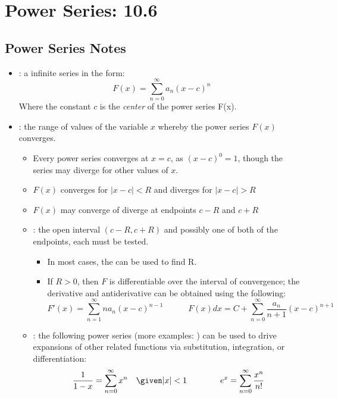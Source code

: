 \chapter{Power Series: 10.6}

\section{Power Series Notes}
\begin{itemize}
  \item {}: a infinite series in the form:
    \[%
    F(x) = \sum_{n=0}^{\infty} a_n (x - c)^n
    \]%
    Where the constant \(c\) is the \textit{center} of the power series F(x).

  \item {}: the range of values of the variable \(x\)
    whereby the power series \(F(x)\) converges.
    \begin{itemize}
      \item Every power series converges at \(x = c\), as \((x-c)^0 = 1\),
        though the series may diverge for other values of \(x\).

      \item \(F(x)\) converges for \(\left| x - c \right| < R \) and diverges
        for \(\left| x - c \right| > R \)

      \item \(F(x)\) may converge of diverge at endpoints \(c-R\) and \(c+R\)

      \item {}: the open interval \((c-R, c+R)\) and
        possibly one of both of the endpoints, each must be tested.
        \begin{itemize}
          \item In most cases, the  can be used to find R.

          \item If \(R > 0\), then \(F\) is differentiable over the interval of
            convergence; the derivative and antiderivative can be obtained
            using the following:
            \[%
            F'(x) = \sum_{n=1}^{\infty} na_n(x-c)^{n-1} \qquad \quad
            F(x)dx = C + \sum_{n=0}^{\infty} \frac{a_n}{n+1}(x-c)^{n+1}
            \]%
        \end{itemize}

      \item {}: the following power series
        (more examples: ) can be used to drive
        expansions of other related functions via substitution, integration, or
        differentiation:
        \[%
          \frac{1}{1-x} = \sum_{n=0}^{\infty} x^n \quad \given |x| < 1
          \qquad \qquad
          e^x = \sum_{n=0}^{\infty} \frac{x^n}{n!}
        \]%

    \end{itemize}

\end{itemize}

